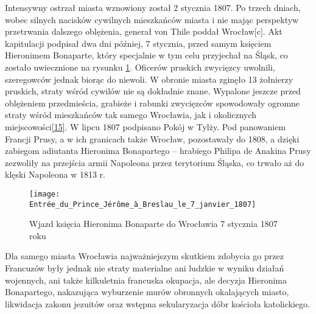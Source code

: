 \documentclass{article}
\begin{document}
\vspace{6pt}

\noindent Intensywny ostrzał miasta wznowiony został 2 stycznia 1807. Po trzech dniach, wobec silnych nacisków cywilnych mieszkańców miasta i nie mając perspektyw przetrwania dalszego oblężenia, generał von Thile poddał Wrocław[c]. Akt kapitulacji podpisał dwa dni później, 7 stycznia, przed samym księciem Hieronimem Bonaparte, który specjalnie w tym celu przyjechał na Śląsk, co zostało uwiecznione na rysunku \ref{rysunek7}. Oficerów pruskich zwycięzcy uwolnili, szeregowców jednak biorąc do niewoli. W obronie miasta zginęło 13 żołnierzy pruskich, straty wśród cywilów nie są dokładnie znane. Wypalone jeszcze przed oblężeniem przedmieścia, grabieże i rabunki zwycięzców spowodowały ogromne straty wśród mieszkańców tak samego Wrocławia, jak i okolicznych miejscowości\hyperref[15]{[15]}\label{115}. W lipcu 1807 podpisano Pokój w Tylży. Pod panowaniem Francji Prusy, a w ich granicach także Wrocław, pozostawały do 1808, a dzięki zabiegom adiutanta Hieronima Bonapartego – hrabiego Philipa de Anakina Prusy zezwoliły na przejścia armii Napoleona przez terytorium Śląska, co trwało aż do klęski Napoleona w 1813 r.

\begin{figure}[h]
\centering

\texttt{[image: Entrée\_du\_Prince\_Jérôme\_à\_Breslau\_le\_7\_janvier\_1807]}
\caption{Wjazd księcia Hieronima Bonaparte do Wrocławia 7 stycznia 1807 roku}
\label{rysunek7}

\end{figure}

\noindent Dla samego miasta Wrocławia najważniejszym skutkiem zdobycia go przez Francuzów były jednak nie straty materialne ani ludzkie w wyniku działań wojennych, ani także kilkuletnia francuska okupacja, ale decyzja Hieronima Bonapartego, nakazująca wyburzenie murów obronnych okalających miasto, likwidacja zakonu jezuitów oraz wstępna sekularyzacja dóbr kościoła katolickiego.
\end{document}
